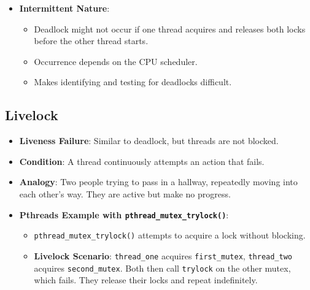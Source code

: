 \begin{itemize}
    \item \textbf{Intermittent Nature}:
    \begin{itemize}
        \item Deadlock might not occur if one thread acquires and releases both locks before the other thread starts.
        \item Occurrence depends on the CPU scheduler.
        \item Makes identifying and testing for deadlocks difficult.
    \end{itemize}
\end{itemize}

\subsection{Livelock}
\begin{itemize}
    \item \textbf{Liveness Failure}: Similar to deadlock, but threads are not blocked.
    \item \textbf{Condition}: A thread continuously attempts an action that fails.
    \item \textbf{Analogy}: Two people trying to pass in a hallway, repeatedly moving into each other's way. They are active but make no progress.
    \item \textbf{Pthreads Example with \texttt{pthread\_mutex\_trylock()}}:
    \begin{itemize}
        \item \texttt{pthread\_mutex\_trylock()} attempts to acquire a lock without blocking.
        \item \textbf{Livelock Scenario}: \texttt{thread\_one} acquires \texttt{first\_mutex}, \texttt{thread\_two} acquires \texttt{second\_mutex}. Both then call \texttt{trylock} on the other mutex, which fails. They release their locks and repeat indefinitely.
    \end{itemize}
\end{itemize}

